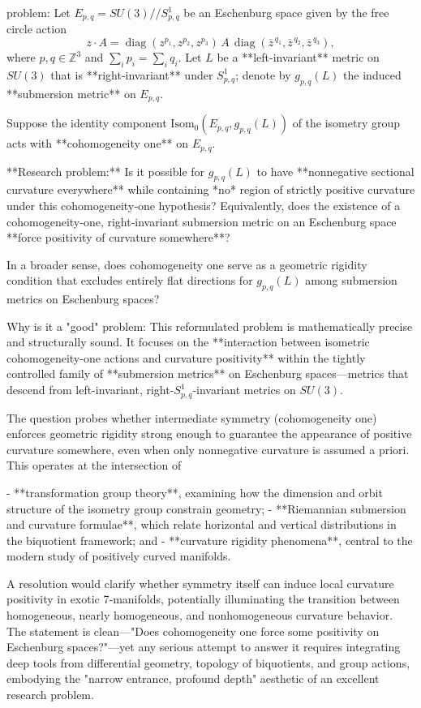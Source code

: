 problem:  
Let \( E_{p,q} = SU(3)//S^1_{p,q} \) be an Eschenburg space given by the free circle action  
\[
z \cdot A = \operatorname{diag}(z^{p_1},z^{p_2},z^{p_3})\,A\,\operatorname{diag}(\overline{z}^{\,q_1},\overline{z}^{\,q_2},\overline{z}^{\,q_3}),
\]
where \(p,q\in\mathbb{Z}^3\) and \(\sum_i p_i=\sum_i q_i\).  
Let \(L\) be a **left-invariant** metric on \(SU(3)\) that is **right-invariant** under \(S^1_{p,q}\); denote by \(g_{p,q}(L)\) the induced **submersion metric** on \(E_{p,q}\).  

Suppose the identity component \(\mathrm{Isom}_0(E_{p,q}, g_{p,q}(L))\) of the isometry group acts with **cohomogeneity one** on \(E_{p,q}\).  

**Research problem:**  
Is it possible for \(g_{p,q}(L)\) to have **nonnegative sectional curvature everywhere** while containing *no* region of strictly positive curvature under this cohomogeneity‑one hypothesis?  
Equivalently, does the existence of a cohomogeneity‑one, right‑invariant submersion metric on an Eschenburg space **force positivity of curvature somewhere**?  

In a broader sense, does cohomogeneity one serve as a geometric rigidity condition that excludes entirely flat directions for \(g_{p,q}(L)\) among submersion metrics on Eschenburg spaces?

Why is it a "good" problem:  
This reformulated problem is mathematically precise and structurally sound. It focuses on the **interaction between isometric cohomogeneity-one actions and curvature positivity** within the tightly controlled family of **submersion metrics** on Eschenburg spaces—metrics that descend from left-invariant, right-\(S^1_{p,q}\)-invariant metrics on \(SU(3)\).  

The question probes whether intermediate symmetry (cohomogeneity one) enforces geometric rigidity strong enough to guarantee the appearance of positive curvature somewhere, even when only nonnegative curvature is assumed a priori. This operates at the intersection of  

- **transformation group theory**, examining how the dimension and orbit structure of the isometry group constrain geometry;  
- **Riemannian submersion and curvature formulae**, which relate horizontal and vertical distributions in the biquotient framework; and  
- **curvature rigidity phenomena**, central to the modern study of positively curved manifolds.  

A resolution would clarify whether symmetry itself can induce local curvature positivity in exotic 7‑manifolds, potentially illuminating the transition between homogeneous, nearly homogeneous, and nonhomogeneous curvature behavior. The statement is clean—"Does cohomogeneity one force some positivity on Eschenburg spaces?"—yet any serious attempt to answer it requires integrating deep tools from differential geometry, topology of biquotients, and group actions, embodying the "narrow entrance, profound depth" aesthetic of an excellent research problem.